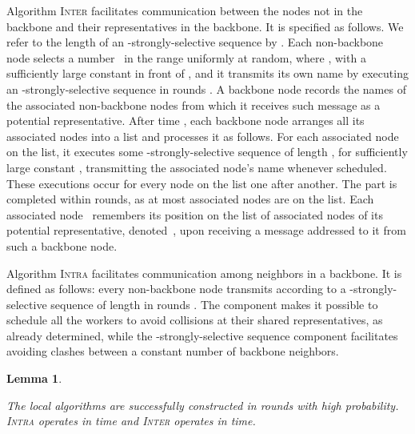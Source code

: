 \documentclass[11pt]{article}
\newtheorem{lemma}{Lemma}
\begin{document}
Algorithm \textsc{Inter} facilitates communication between the nodes not in the backbone and their representatives in the backbone.
It is specified as follows. 
We refer to the length of an -strongly-selective sequence by .
Each non-backbone node selects a number~ in the range  uniformly at random, where , with a sufficiently large constant in front of , and it transmits its own name by executing an -strongly-selective sequence in rounds  .
A backbone node records the names of the associated non-backbone nodes from which it receives such message as a potential representative.
After time , each backbone node arranges all its associated nodes into a list and processes it as follows. 
For each associated node on the list, it executes  some -strongly-selective sequence of length , for sufficiently large constant , transmitting the associated node's name whenever scheduled.
These executions occur  for every node on the list one after another.
The part is completed within  rounds, as at most  associated nodes are on the list.
Each associated node~ remembers its position on the list of associated nodes of its potential representative, denoted~, upon receiving a message addressed to it from such a backbone node.

Algorithm \textsc{Intra} facilitates communication among neighbors in a backbone.
It  is defined as follows: every non-backbone node  transmits according to a -strongly-selective sequence of length  in rounds .
The component  makes it possible to schedule all the workers to avoid collisions at their shared representatives, as already determined, while the -strongly-selective sequence component facilitates avoiding clashes between a constant number of backbone neighbors.



\begin{lemma}
\label{lem:intra-and-inter}

The local algorithms are successfully constructed in  rounds with high probability.
\textsc{Intra} operates in  time and \textsc{Inter} operates in  time.
\end{lemma}
\end{document}
